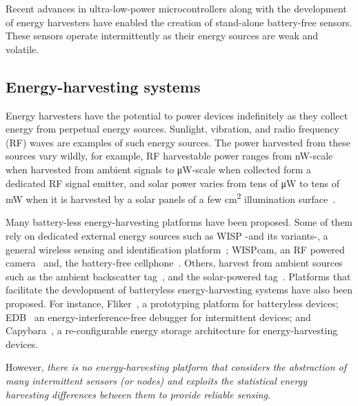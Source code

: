 Recent advances in ultra-low-power microcontrollers along with the development of energy harvesters have enabled the creation of stand-alone battery-free sensors. These sensors operate intermittently as their energy sources are weak and volatile.
%
\subsection{Energy-harvesting systems}
Energy harvesters have the potential to power devices indefinitely as they collect energy from perpetual energy sources. Sunlight, vibration, and radio frequency (RF) waves are examples of such energy sources. The power harvested from these sources vary wildly, for example, RF harvestable power ranges from
\si{\nano\watt}-scale when harvested from ambient signals to \si{\uW}-scale when collected form a dedicated RF signal emitter, and solar power varies from tens of \si{\uW} to tens of \si{\mW} when it is harvested by a solar panels of a few \si{\cm^2} illumination surface~\cite{lucia2017intermittent,rao2017ambient}.

Many battery-less energy-harvesting platforms have been proposed. Some of them rely on dedicated external energy sources such as WISP -and its variants-, a general wireless sensing and identification platform~\cite{smith_ubicomp_2006,zhao2015nfc,moo}; WISPcam,  an RF powered camera~\cite{naderiparizi_rfid_2015} and, the battery-free cellphone~\cite{talla2017battery}. Others, harvest from ambient sources such as the ambient backscatter tag~\cite{liu2013ambient}, and the solar-powered tag~\cite{majid2019multi}. Platforms that facilitate the development of batteryless energy-harvesting systems have also been proposed. For instance, Fliker~\cite{flickersensys2017}, a prototyping platform for batteryless devices; EDB~\cite{colin2016energy} an energy-interference-free debugger for intermittent devices;  and Capybara~\cite{colin2018reconfigurable}, a re-configurable energy storage architecture for energy-harvesting devices.

However, \emph{there is no energy-harvesting platform that considers the abstraction of many intermittent sensors (or nodes) and exploits the statistical energy harvesting differences between them to provide reliable sensing}.

